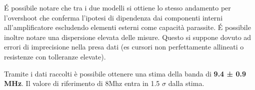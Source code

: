 \'E possibile notare che tra i due modelli si ottiene lo stesso andamento per l'overshoot che conferma l'ipotesi di dipendenza dai componenti interni all'amplificatore escludendo elementi esterni come capacità parassite.
\'E possibile inoltre notare una dispersione elevata delle misure. Questo si suppone dovuto ad errori di imprecisione nella presa dati (es cursori non perfettamente allineati o resistenze con tolleranze elevate).

Tramite i dati raccolti è possibile ottenere una stima della banda di \textbf{9.4 ± 0.9 MHz}. Il valore di riferimento di 8Mhz entra in 1.5 $\sigma$ dalla stima.

